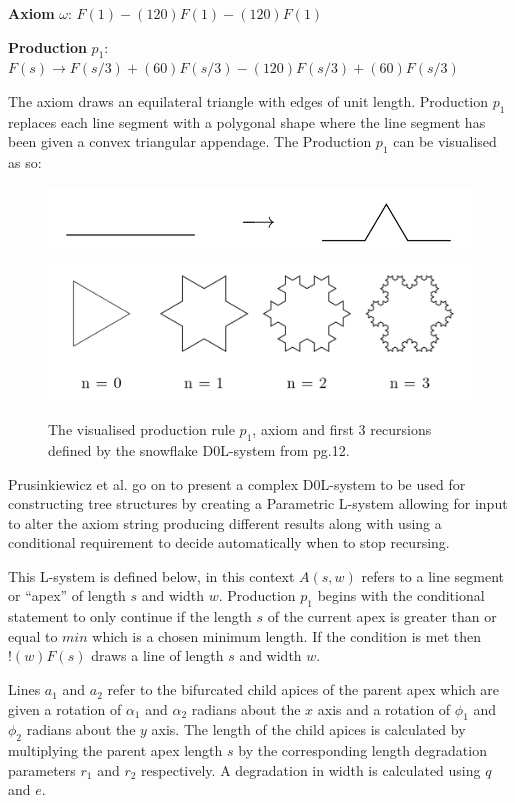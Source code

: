 \documentclass[final]{cmpreport}
\begin{document}
\textbf{Axiom} $\omega$: $F(1) - (120)F(1) - (120)F(1)$ 

\indent \textbf{Production} $p_1$: $F(s) \rightarrow F(s/3) + (60)F(s/3) - (120)F(s/3) + (60)F(s/3)$

The axiom draws an equilateral triangle with edges of unit length. Production $p_1$ replaces 
each line segment with a polygonal shape where the line segment has been given a convex 
triangular appendage. The Production $p_1$ can be visualised as so:

\begin{figure}[ht]
        \includegraphics[scale=0.3]{production_p1.PNG}
        \centering
        \includegraphics[scale=0.4]{triangle_snowflake_lsystem.PNG}
        \centering
        \caption{The visualised production rule $p_1$, axiom and first 3 recursions 
        defined by the snowflake D0L-system from \citep{prusinkiewicz1996systems} pg.12.}
        \label{fig:snowflake-lsystem}
\end{figure}

Prusinkiewicz et al. go on to present a complex D0L-system to be used for constructing 
tree structures by creating a Parametric L-system allowing for input to alter the axiom 
string producing different results along with using a conditional requirement to 
decide automatically when to stop recursing. 

This L-system is defined below, in this 
context $A(s, w)$ refers to a line segment or ``apex'' of length $s$ and width $w$. 
Production $p_1$ begins with the conditional statement to only continue if the length $s$ 
of the current apex is greater than or equal to $min$ which is a chosen minimum length. If 
the condition is met then $!(w)F(s)$ draws a line of length $s$ and width $w$. 

Lines $a_1$ and $a_2$ refer to the bifurcated child apices of the parent apex which are 
given a rotation of $\alpha_1$ and $\alpha_2$ radians about the $x$ axis and a rotation of 
$\phi_1$ and $\phi_2$ radians about the $y$ axis. The length of the child apices is calculated 
by multiplying the parent apex length $s$ by the corresponding length degradation parameters 
$r_1$ and $r_2$ respectively. A degradation in width is calculated using $q$ and $e$.
\end{document}

